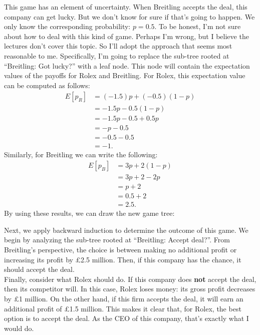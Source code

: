 \documentclass[11pt]{article}
\begin{document}
This game has an element of uncertainty. When Breitling accepts the deal,
this company can get lucky. But we don't know for sure if that's going to
happen. We only know the corresponding probability: \(p=0.5\). To be
honest, I'm not sure about how to deal with this kind of game. Perhaps I'm
wrong, but I believe the lectures don't cover this topic. So I'll adopt the
approach that seems most reasonable to me. Specifically, I'm going to
replace the sub-tree rooted at ``Breitling: Got lucky?'' with a leaf node.
This node will contain the expectation values of the payoffs for Rolex and
Breitling. For Rolex, this expectation value can be computed as follows:
\begin{align*}
E[p_R]&=(-1.5)p+(-0.5)(1-p)\\
&=-1.5p-0.5(1-p)\\
&=-1.5p-0.5+0.5p\\
&=-p-0.5\\
&=-0.5-0.5\\
&=-1.
\end{align*}
Similarly, for Breitling we can write the following:
\begin{align*}
E[p_B]&=3p+2(1-p)\\
&=3p+2-2p\\
&=p+2\\
&=0.5+2\\
&=2.5.
\end{align*}
By using these results, we can draw the new game tree:
\begin{center}
\end{center}

Next, we apply backward induction to determine the outcome of this game. We
begin by analyzing the sub-tree rooted at ``Breitling: Accept deal?''. From
Breitling's perspective, the choice is between making no additional profit
or increasing its profit by \pounds2.5 million. Then, if this company has
the chance, it should accept the deal.\\
Finally, consider what Rolex should do. If this company does \textbf{not} accept
the deal, then its competitor will. In this case, Rolex loses money: its
gross profit decreases by \pounds1 million. On the other hand, if this firm
accepts the deal, it will earn an additional profit of \pounds1.5 million.
This makes it clear that, for Rolex, the best option is to accept the deal.
As the CEO of this company, that's exactly what I would do.
\end{document}
